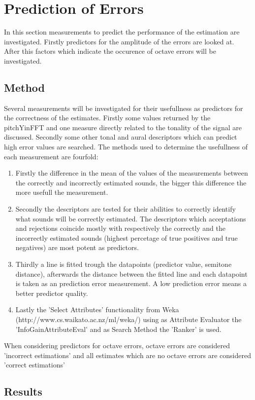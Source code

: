 \documentclass{article}
\begin{document}
\section{Prediction of Errors}
In this section measurements to predict the performance of the estimation are investigated. Firstly predictors for the amplitude of the errors are looked at. After this factors which indicate the occurence of octave errors will be investigated.

\subsection{Method}
Several measurements will be investigated for their usefullness as predictors for the correctness of the estimates. Firstly some values returned by the pitchYinFFT and one measure directly related to the tonality of the signal are discussed. Secondly some other tonal and aural descriptors which can predict high error values are searched. The methods used to determine the usefullness of each measurement are fourfold:
\begin{enumerate}
    \item Firstly the difference in the mean of the values of the measurements between the correctly and incorrectly estimated sounds, the bigger this difference the more usefull the measurement. 
    \item Secondly the descriptors are tested for their abilities to correctly identify what sounds will be correctly estimated. The descriptors which acceptations and rejections coincide mostly with respectively the correctly and the incorrectly estimated sounds (highest percetage of true positives and true negatives) are most potent as predictors. 
    \item Thirdly a line is fitted trough the datapoints (predictor value, semitone distance), afterwards the distance between the fitted line and each datapoint is taken as an prediction error measurement. A low prediction error means a better predictor quality.
    \item Lastly the 'Select Attributes' functionality from Weka (http://www.cs.waikato.ac.nz/ml/weka/) using as Attribute Evaluator the 'InfoGainAttributeEval' and as Search Method the 'Ranker' is used.
\end{enumerate}
When considering predictors for octave errors, octave errors are considered 'incorrect estimations' and all estimates which are no octave errors are considered 'correct estimations'
\subsection{Results}
\end{document}
